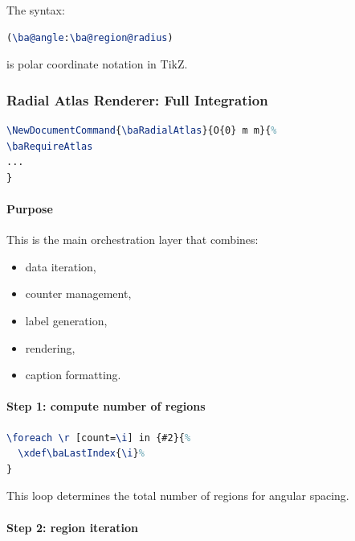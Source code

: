 The syntax:

\begin{lstlisting}[language=LaTeX]
(\ba@angle:\ba@region@radius)
\end{lstlisting}

is polar coordinate notation in TikZ.



\subsubsection{Radial Atlas Renderer: Full Integration}

\begin{lstlisting}[language=LaTeX]
\NewDocumentCommand{\baRadialAtlas}{O{0} m m}{%
\baRequireAtlas
...
}
\end{lstlisting}

\paragraph{Purpose}

This is the main orchestration layer that combines:

\begin{itemize}
\item data iteration,
\item counter management,
\item label generation,
\item rendering,
\item caption formatting.
\end{itemize}



\paragraph{Step 1: compute number of regions}

\begin{lstlisting}[language=LaTeX]
\foreach \r [count=\i] in {#2}{%
  \xdef\baLastIndex{\i}%
}
\end{lstlisting}

This loop determines the total number of regions for angular spacing.



\paragraph{Step 2: region iteration}

